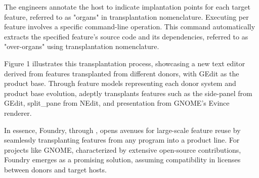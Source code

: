 The engineers annotate the host to indicate implantation points for each target feature, referred to as "organs" in transplantation nomenclature. Executing \prodScalpel per feature involves a specific command-line operation. This command automatically extracts the specified feature's source code and its dependencies, referred to as "over-organs" using transplantation nomenclature.

Figure 1 illustrates this transplantation process, showcasing a new text editor derived from features transplanted from different donors, with GEdit as the product base. Through feature models representing each donor system and product base evolution, \prodScalpel adeptly transplants features such as the side-panel from GEdit, split\_pane from NEdit, and presentation from GNOME's Evince renderer.

In essence, Foundry, through \prodScalpel, opens avenues for large-scale feature reuse by seamlessly transplanting features from any program into a product line. For projects like GNOME, characterized by extensive open-source contributions, Foundry emerges as a promising solution, assuming compatibility in licenses between donors and target hosts.

